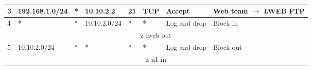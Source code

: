 \documentclass[a4paper, 11pt, oneside]{article}
\begin{document}
\begin{table}[H]
{\begin{tabular}{|llllllll|}
\multicolumn{1}{|l|}{3}                         & \multicolumn{1}{l|}{192.168.1.0/24}                                               & \multicolumn{1}{l|}{*}                                                              & \multicolumn{1}{l|}{10.10.2.2}                                                         & \multicolumn{1}{l|}{21}                                                                  & \multicolumn{1}{l|}{TCP}               & \multicolumn{1}{l|}{Accept}          & Web team $\rightarrow$ LWEB FTP        \\ \hline
\multicolumn{1}{|l|}{4}                         & \multicolumn{1}{l|}{*}                                                            & \multicolumn{1}{l|}{*}                                                              & \multicolumn{1}{l|}{10.10.2.0/24}                                                      & \multicolumn{1}{l|}{*}                                                                   & \multicolumn{1}{l|}{*}                 & \multicolumn{1}{l|}{Log and drop}    & Block in                               \\ \hline
\multicolumn{8}{|c|}{{\color[HTML]{FE0000} z-lweb out}}                                                                                                                                                                                                                                                                                                                                                                                                                                                                                \\ \hline
\multicolumn{1}{|l|}{5}                         & \multicolumn{1}{l|}{10.10.2.0/24}                                                 & \multicolumn{1}{l|}{*}                                                              & \multicolumn{1}{l|}{*}                                                                 & \multicolumn{1}{l|}{*}                                                                   & \multicolumn{1}{l|}{*}                 & \multicolumn{1}{l|}{Log and drop}    & Block out                              \\ \hline
\multicolumn{8}{|c|}{{\color[HTML]{FE0000} z-u1 in}}                                                                                                                                                                                                                                                                                                                                                                                                                                                                                   \\ \hline

\end{tabular}}
\end{table}
\end{document}
